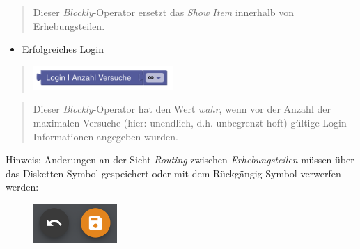\documentclass[
  letterpaper,
  DIV=11]{scrreprt}
\providecommand{\tightlist}{%
  \setlength{\itemsep}{0pt}\setlength{\parskip}{0pt}}\usepackage{longtable,booktabs,array}
\begin{document}
\begin{tcolorbox}
\begin{quote}
Dieser \emph{Blockly}-Operator ersetzt das \emph{Show Item} innerhalb
von Erhebungsteilen.
\end{quote}

\begin{itemize}
\tightlist
\item
  Erfolgreiches Login
\end{itemize}

\begin{quote}
\includegraphics[width=2.08333in,height=\textheight]{img/screenshot-blockly-check-login-infinite-study-part-01-DEU.png}
\end{quote}

\begin{quote}
Dieser \emph{Blockly}-Operator hat den Wert \emph{wahr}, wenn vor der
Anzahl der maximalen Versuche (hier: unendlich, d.h. unbegrenzt hoft)
gültige Login-Informationen angegeben wurden.
\end{quote}

Hinweis: Änderungen an der Sicht \emph{Routing} zwischen
\emph{Erhebungsteilen} müssen über das Disketten-Symbol gespeichert oder
mit dem Rückgängig-Symbol verwerfen werden:

\begin{figure}[H]

\includegraphics[width=1.25in,height=\textheight]{img/screenshot-icons-undo-and-save-01.png} \hfill{}

\end{figure}

\end{tcolorbox}
\end{document}
